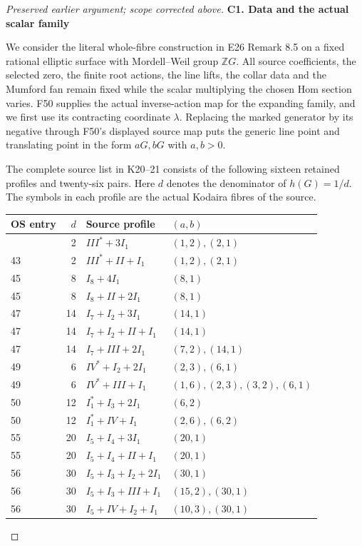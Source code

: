 \begin{proof}[Preserved earlier argument; scope corrected above]
\par

\medskip\noindent\textbf{C1. Data and the actual scalar family}

\par\nobreak

We consider the literal whole-fibre construction in E26 Remark 8.5
on a fixed rational elliptic surface with Mordell--Weil group
\(\mathbb ZG\). All source coefficients, the selected zero, the
finite root actions, the line lifts, the collar data and the
Mumford fan remain fixed while the scalar multiplying the chosen
Hom section varies. F50 supplies the actual inverse-action map
for the expanding family, and we first use its contracting
coordinate \(\lambda\). Replacing the marked generator by its
negative through F50's displayed source map puts the generic
line point and translating point in the form \(aG,bG\) with
\(a,b>0\).

The complete source list in K20--21 consists of the following
sixteen retained profiles and twenty-six pairs. Here \(d\)
denotes the denominator of \(h(G)=1/d\). The symbols in each
profile are the actual Kodaira fibres of the source.

\begin{longtable}[]{@{}lrll@{}}
\toprule\noalign{}
OS entry & \(d\) & Source profile & \((a,b)\) \\
\midrule\noalign{}
\endhead
\bottomrule\noalign{}
\endlastfoot
43 & 2 & \(III^*+3I_1\) & \((1,2),(2,1)\) \\
43 & 2 & \(III^*+II+I_1\) & \((1,2),(2,1)\) \\
45 & 8 & \(I_8+4I_1\) & \((8,1)\) \\
45 & 8 & \(I_8+II+2I_1\) & \((8,1)\) \\
47 & 14 & \(I_7+I_2+3I_1\) & \((14,1)\) \\
47 & 14 & \(I_7+I_2+II+I_1\) & \((14,1)\) \\
47 & 14 & \(I_7+III+2I_1\) & \((7,2),(14,1)\) \\
49 & 6 & \(IV^*+I_2+2I_1\) & \((2,3),(6,1)\) \\
49 & 6 & \(IV^*+III+I_1\) & \((1,6),(2,3),(3,2),(6,1)\) \\
50 & 12 & \(I_1^*+I_3+2I_1\) & \((6,2)\) \\
50 & 12 & \(I_1^*+IV+I_1\) & \((2,6),(6,2)\) \\
55 & 20 & \(I_5+I_4+3I_1\) & \((20,1)\) \\
55 & 20 & \(I_5+I_4+II+I_1\) & \((20,1)\) \\
56 & 30 & \(I_5+I_3+I_2+2I_1\) & \((30,1)\) \\
56 & 30 & \(I_5+I_3+III+I_1\) & \((15,2),(30,1)\) \\
56 & 30 & \(I_5+IV+I_2+I_1\) & \((10,3),(30,1)\) \\
\end{longtable}


\end{proof}
